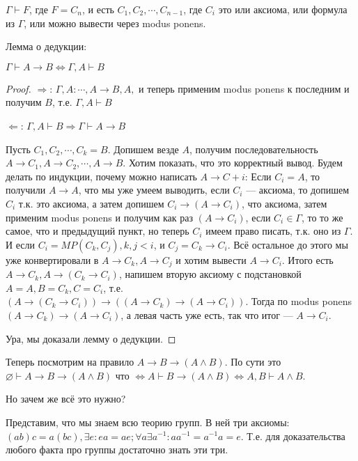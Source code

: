\begin{definition}
	$\Gamma \vdash F$, где $F = C_n$, и есть $C_1, C_2, \cdots, C_{n-1}$,  где $C_i$ это или аксиома, или формула из $\Gamma$, или можно вывести через modus ponens.  
\end{definition}
\begin{lemma}
	Лемма о дедукции:

	$\Gamma \vdash A \to B \Leftrightarrow \Gamma, A \vdash B$
\end{lemma}
\begin{proof}
	
	$\Rightarrow$: $\Gamma, A : \cdots, A \to B, A, $ и теперь применим modus ponens к последним и получим $B$, т.е. $\Gamma, A \vdash B$

	$\Leftarrow$: $\Gamma, A \vdash B \Rightarrow \Gamma \vdash A \to B$

	Пусть $C_1, C_2, \cdots, C_k = B$. Допишем везде $A$, получим последовательность $A \to C_1, A \to C_2, \cdots, A \to B$. Хотим показать, что это корректный вывод. Будем делать по индукции, почему можно написать $A \to C+i$: Если $C_i = A$, то получили $A \to A$, что мы уже умеем выводить, если $C_i$ --- аксиома, то допишем $C_i$ т.к. это аксиома, а затем допишем $C_i \to (A \to C_i)$, что аксиома, затем применим modus ponens и получим как раз $(A \to C_i)$, если $C_i \in \Gamma$, то то же самое, что и предыдущий пункт, но теперь $C_i$ имеем право писать, т.к. оно из $\Gamma$. И если $C_i = MP(C_k, C_j), k, j < i$, и $C_j = C_k \to C_i$. Всё остальное до этого мы уже конвертировали в $A \to C_k, A \to C_j$ и хотим вывести $A \to C_i$. Итого есть $A \to C_k, A \to (C_k \to C_i)$, напишем вторую аксиому с подстановкой $A = A, B = C_k, C = C_i$, т.е. $(A \to (C_k \to C_i)) \to ((A \to C_k) \to (A \to C_i))$. Тогда по modus ponens $(A \to C_k) \to (A \to C_i)$, а левая часть уже есть, так что итог --- $A \to C_i$.

	Ура, мы доказали лемму о дедукции.
\end{proof}

Теперь посмотрим на правило $A \to B \to (A \land B)$. По сути это $\varnothing \vdash A \to B \to (A \land B)$ что $\Leftrightarrow A \vdash B \to (A \land B) \Leftrightarrow A, B \vdash A \land B$.

Но зачем же всё это нужно?

Представим, что мы знаем всю теорию групп. В ней три аксиомы: $(ab)c = a(bc), \exists e : ea = ae; \forall a \exists a^{-1}: a a^{-1} = a^{-1} a = e$. Т.е. для доказательства любого факта про группы достаточно знать эти три. 

